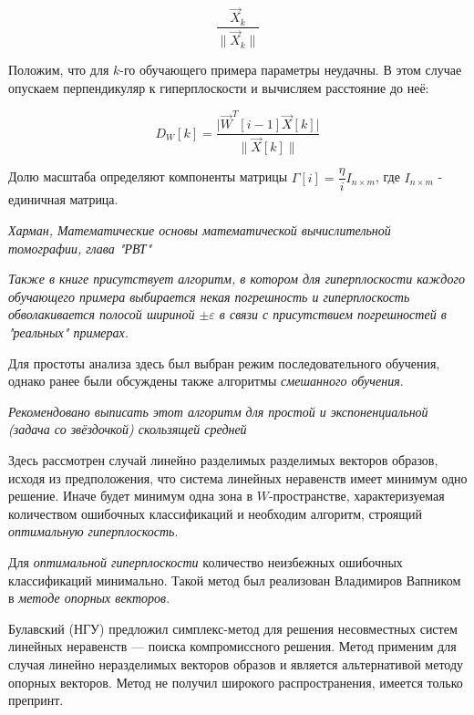 \documentclass{article}
\numberwithin{equation}{subsection}
\begin{document}
\begin{equation}
    \dfrac{\vec{X}_k}{\| \vec{X}_k \|}
\end{equation}

Положим, что для $k$-го обучающего примера параметры неудачны. В этом случае опускаем перпендикуляр
к гиперплоскости и вычисляем расстояние до неё:

\begin{equation}
    D_W [k] = \dfrac{\lvert \vec{W}^T [i-1] \vec{X}[k] \rvert}{\| \vec{X}[k] \|}
\end{equation}

Долю масштаба определяют компоненты матрицы $\Gamma[i]=\dfrac{\eta}{i} I_{n\times m}$, где $I_{n \times m}$ - единичная матрица.

\begin{myquote}
    \textit{Харман, Математические основы математической вычислительной томографии, глава "РВТ"}
\end{myquote}

\begin{myquote}
    \textit{Также в книге присутствует алгоритм, в котором для гиперплоскости каждого обучающего 
    примера выбирается некая погрешность и гиперплоскость обволакивается полосой
    шириной $\pm \varepsilon$ в связи с присутствием погрешностей в "реальных" примерах.}
\end{myquote}

Для простоты анализа здесь был выбран режим последовательного обучения, однако ранее были обсуждены 
также алгоритмы
\textit{смешанного обучения}.

\begin{myquote}
    \textit{Рекомендовано выписать этот алгоритм для простой и экспоненциальной (задача со звёздочкой) 
    скользящей средней}
\end{myquote}

Здесь рассмотрен случай линейно разделимых разделимых векторов образов, исходя из предположения, что система 
линейных неравенств имеет минимум одно решение.
Иначе будет минимум одна зона в $W$-пространстве, характеризуемая количеством ошибочных классификаций 
и необходим алгоритм, строящий \textit{оптимальную гиперплоскость}.

Для \textit{оптимальной гиперплоскости} количество неизбежных ошибочных классификаций минимально. 
Такой метод был реализован Владимиров Вапником в \textit{методе опорных векторов}.

Булавский (НГУ) предложил симплекс-метод для решения несовместных систем линейных неравенств --- 
поиска компромиссного решения. 
Метод применим для случая линейно неразделимых векторов образов и является альтернативой методу 
опорных векторов. 
Метод не получил широкого распространения, имеется только препринт.
\end{document}
